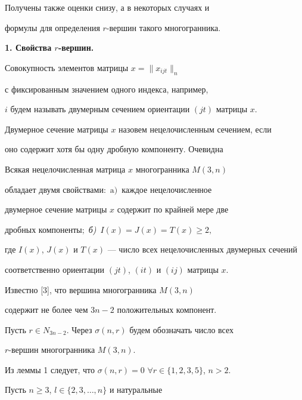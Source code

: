 Получены также оценки снизу, а в некоторых случаях и


формулы для определения $r$-вершин такого многогранника.





{\bf 1. Свойства $r$-вершин.}


Совокупность элементов матрицы $x=\|x_{ijt}\|_n$


с фиксированным значением одного индекса, например,


$i$ будем называть двумерным сечением ориентации $(jt)$ матрицы $x$.


Двумерное сечение матрицы $x$ назовем нецелочисленным сечением, если


оно содержит хотя бы одну дробную компоненту. Очевидна





\begin{lem}


Всякая нецелочисленная матрица $x$ многогранника $M(3,n)$


обладает двумя свой\-ствами$:$ $\mathrm a)$~каждое нецелочисленное


двумерное сечение матрицы $x$ содержит по крайней мере две


дробных компоненты$;$ {\em б)}~$I(x)=J(x)=T(x)\geq 2,$


где $I(x)$, $J(x)$ и $T(x)$ --- число всех нецелочисленных двумерных сечений


соответственно ориентации $(jt)$, $(it)$ и $(ij)$ матрицы $x$.


\end{lem}





Известно [3], что вершина многогранника $M(3,n)$ 


содержит не более чем $3n-2$ положительных компонент.





Пусть $r\in N_{3n-2}$. Через $\sigma (n,r)$ будем обозначать число всех


$r$-вершин многогранника $M(3,n)$.





Из леммы 1 следует, что $\sigma (n,r)=0$ $\forall r\in\{1,2,3,5\}$, $n>2.$





Пусть $n\geq 3$, $l\in\{ 2,3,\dotsc,n\}$ и натуральные


